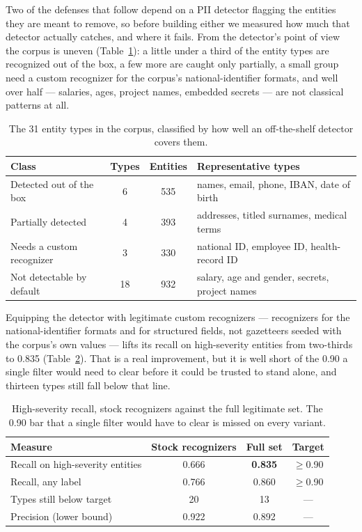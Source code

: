 \documentclass[11pt,a4paper]{article}
\begin{document}
Two of the defenses that follow depend on a PII detector flagging the entities they are meant to
remove, so before building either we measured how much that detector actually catches, and where it
fails. From the detector's point of view the corpus is uneven (Table~\ref{tab:presclass}): a little
under a third of the entity types are recognized out of the box, a few more are caught only partially,
a small group need a custom recognizer for the corpus's national-identifier formats, and well over half
--- salaries, ages, project names, embedded secrets --- are not classical patterns at all.

\begin{table}[h]
\centering
\caption{The 31 entity types in the corpus, classified by how well an off-the-shelf detector covers
them.}
\label{tab:presclass}
\begin{tabular}{lccp{6.2cm}}
\toprule
\textbf{Class} & \textbf{Types} & \textbf{Entities} & \textbf{Representative types}\\
\midrule
Detected out of the box & 6 & 535 & names, email, phone, IBAN, date of birth\\
Partially detected & 4 & 393 & addresses, titled surnames, medical terms\\
Needs a custom recognizer & 3 & 330 & national ID, employee ID, health-record ID\\
Not detectable by default & 18 & 932 & salary, age and gender, secrets, project names\\
\bottomrule
\end{tabular}
\end{table}

Equipping the detector with legitimate custom recognizers --- recognizers for the national-identifier
formats and for structured fields, not gazetteers seeded with the corpus's own values --- lifts its
recall on high-severity entities from two-thirds to 0.835 (Table~\ref{tab:presrecall}). That is a real
improvement, but it is well short of the 0.90 a single filter would need to clear before it could be
trusted to stand alone, and thirteen types still fall below that line.

\begin{table}[h]
\centering
\caption{High-severity recall, stock recognizers against the full legitimate set. The 0.90 bar that a
single filter would have to clear is missed on every variant.}
\label{tab:presrecall}
\begin{tabular}{lccc}
\toprule
\textbf{Measure} & \textbf{Stock recognizers} & \textbf{Full set} & \textbf{Target}\\
\midrule
Recall on high-severity entities & 0.666 & \textbf{0.835} & $\geq$0.90\\
Recall, any label & 0.766 & 0.860 & $\geq$0.90\\
Types still below target & 20 & 13 & ---\\
Precision (lower bound) & 0.922 & 0.892 & ---\\
\bottomrule
\end{tabular}
\end{table}
\end{document}
